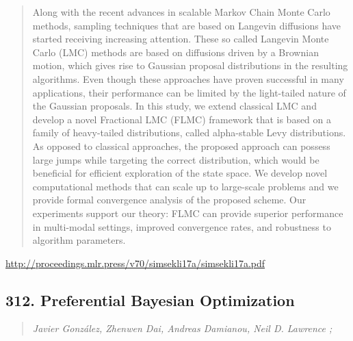 \documentclass{article}
\begin{document}
\begin{quote}
    Along with the recent advances in scalable Markov Chain Monte Carlo methods, sampling techniques that are based on Langevin diffusions have started receiving increasing attention. These so called Langevin Monte Carlo (LMC) methods are based on diffusions driven by a Brownian motion, which gives rise to Gaussian proposal distributions in the resulting algorithms. Even though these approaches have proven successful in many applications, their performance can be limited by the light-tailed nature of the Gaussian proposals. In this study, we extend classical LMC and develop a novel Fractional LMC (FLMC) framework that is based on a family of heavy-tailed distributions, called alpha-stable Levy distributions. As opposed to classical approaches, the proposed approach can possess large jumps while targeting the correct distribution, which would be beneficial for efficient exploration of the state space. We develop novel computational methods that can scale up to large-scale problems and we provide formal convergence analysis of the proposed scheme. Our experiments support our theory: FLMC can provide superior performance in multi-modal settings, improved convergence rates, and robustness to algorithm parameters.  
\end{quote}

\href{http://proceedings.mlr.press/v70/simsekli17a/simsekli17a.pdf}{http://proceedings.mlr.press/v70/simsekli17a/simsekli17a.pdf}

\subsection{312. Preferential Bayesian Optimization}

\begin{quote}
\footnotesize{\textit{Javier González, Zhenwen Dai, Andreas Damianou, Neil D. Lawrence ;}}

\end{quote}
\end{document}
